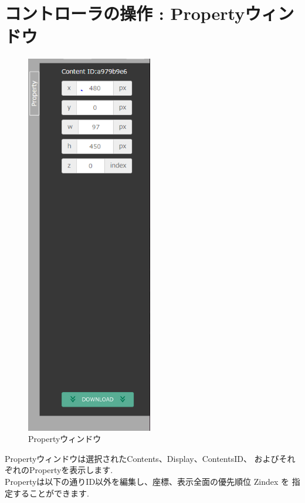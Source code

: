 \documentclass[a4paper,10pt,oneside]{jsbook}
\begin{document}
\clearpage 

\chapter{コントローラの操作 : Propertyウィンドウ }
\begin{figure}
	\begin{center}
		\includegraphics[width=5.5cm]{image/Prop_Down.PNG}
	\end{center}
	\caption{Propertyウィンドウ}
	\label{fig:propall}
\end{figure}

Propertyウィンドウは選択されたContents、Display、ContentsID、
およびそれぞれのPropertyを表示します.\\

Propertyは以下の通りID以外を編集し、座標、表示全面の優先順位 Zindex を
指定することができます.\\
\end{document}
